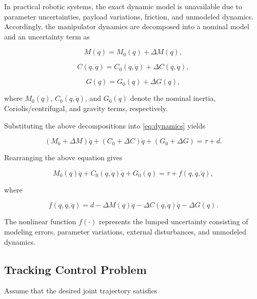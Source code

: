 In practical robotic systems, the exact dynamic model is unavailable due to parameter uncertainties, payload variations, friction, and unmodeled dynamics. Accordingly, the manipulator dynamics are decomposed into a nominal model and an uncertainty term as

\begin{equation}
	M(q)=M_0(q)+\Delta M(q),
\end{equation}

\begin{equation}
	C(q,\dot q)=C_0(q,\dot q)+\Delta C(q,\dot q),
\end{equation}

\begin{equation}
	G(q)=G_0(q)+\Delta G(q),
\end{equation}

where $M_0(q)$, $C_0(q,\dot q)$, and $G_0(q)$ denote the nominal inertia, Coriolis/centrifugal, and gravity terms, respectively.

Substituting the above decompositions into \eqref{eq:dynamics} yields

\begin{equation}
	\left(M_0+\Delta M\right)\ddot q
	+\left(C_0+\Delta C\right)\dot q
	+\left(G_0+\Delta G\right)
	=
	\tau+d.
\end{equation}

Rearranging the above equation gives

\begin{equation}
	M_0(q)\ddot q
	+
	C_0(q,\dot q)\dot q
	+
	G_0(q)
	=
	\tau
	+
	f(q,\dot q,\ddot q),
	\label{eq:nominal}
\end{equation}

where

\begin{equation}
	f(q,\dot q,\ddot q)
	=
	d
	-
	\Delta M(q)\ddot q
	-
	\Delta C(q,\dot q)\dot q
	-
	\Delta G(q).
	\label{eq:lumped}
\end{equation}

The nonlinear function $f(\cdot)$ represents the lumped uncertainty consisting of modeling errors, parameter variations, external disturbances, and unmodeled dynamics.


\subsection{Tracking Control Problem}

Assume that the desired joint trajectory satisfies

